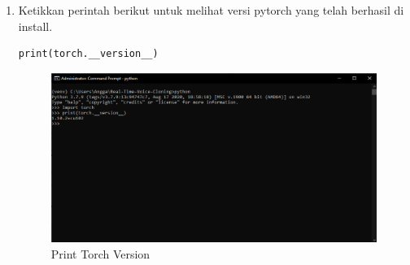 \begin{enumerate}
\item Ketikkan perintah berikut untuk melihat versi pytorch yang telah berhasil di install.
\begin{verbatim}
print(torch.__version__)
\end{verbatim}
\begin{figure}[H]
\centering
\includegraphics[scale=.35]{figures/pytorch7}
\caption{Print Torch Version}
\label{pytorch7}
\end{figure}

\end{enumerate}

